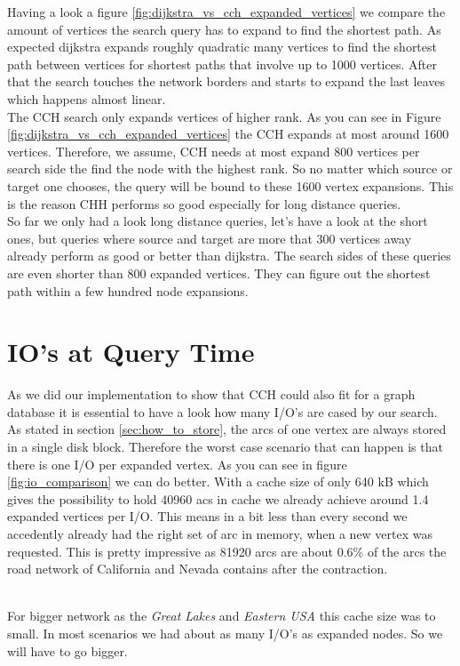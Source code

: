 Having a look a figure \ref{fig:dijkstra_vs_cch_expanded_vertices} we compare the amount of vertices the search query has to expand to find the shortest path. As expected dijkstra expands roughly quadratic many vertices to find the shortest path between vertices for shortest paths that involve up to 1000 vertices.
After that the search touches the network borders and starts to expand the last leaves which happens almost linear.\\
The CCH search only expands vertices of higher rank. As you can see in Figure \ref{fig:dijkstra_vs_cch_expanded_vertices} the CCH expands at most around 1600 vertices. Therefore, we assume, CCH needs at most expand 800 vertices per search side the find the node with the highest rank. So no matter which source or target one chooses, the query will be bound to these 1600 vertex expansions.
This is the reason CHH performs so good especially for long distance queries.
\\
So far we only had a look long distance queries, let's have a look at the short ones, but queries where source and target are more that 300 vertices away already perform as good or better than dijkstra. The search sides of these queries are even shorter than 800 expanded vertices. They can figure out the shortest path within a few hundred node expansions.



\section{IO's at Query Time}

As we did our implementation to show that CCH could also fit for a graph database it is essential to have a look how many I/O's are cased by our search. As stated in section \ref{sec:how_to_store}, the arcs of one vertex are always stored in a single disk block. Therefore the worst case scenario that can happen is that there is one I/O per expanded vertex.
As you can see in figure \ref{fig:io_comparison} we can do better. With a cache size of only 640 kB which gives the possibility to hold 40960 acs in cache we already achieve around 1.4 expanded vertices per I/O. This means in a bit less than every second we accedently already had the right set of arc in memory, when a new vertex was requested. This is pretty 
impressive as 81920 arcs are about 0.6\%  of the arcs the road network of California and Nevada contains after the contraction.

\\
For bigger network as the \textit{Great Lakes} and \textit{Eastern USA} this cache size was to small. In most scenarios we had about as many I/O's as  expanded nodes. So we will have to go bigger.




%


